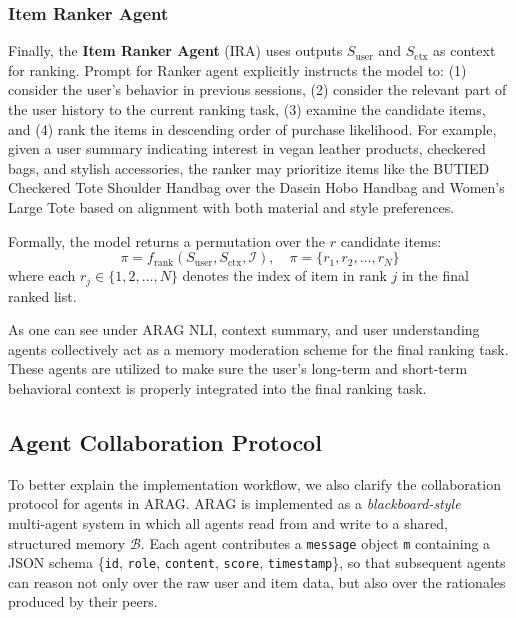 \documentclass[sigconf]{acmart}
\begin{document}
\subsubsection{Item Ranker Agent}

Finally, the \textbf{Item Ranker Agent} (IRA) uses outputs $S_{\mathrm{user}}$ and $S_{\mathrm{ctx}}$ as context for ranking. Prompt for Ranker agent explicitly instructs the model to: (1) consider the user’s behavior in previous sessions, (2) consider the relevant part of the user history to the current ranking task, (3) examine the candidate items, and (4) rank the items in descending order of purchase likelihood. For example, given a user summary indicating interest in vegan leather products, checkered bags, and stylish accessories, the ranker may prioritize items like the BUTIED Checkered Tote Shoulder Handbag over the Dasein Hobo Handbag and Women's Large Tote based on alignment with both material and style preferences.

Formally, the model returns a permutation over the $r$ candidate items:
\[
\pi = f_{\text{rank}}(S_{\mathrm{user}}, S_{\mathrm{ctx}} , \mathcal{I}), \quad \pi = \{r_1, r_2, \dots, r_N\}
\]
where each $r_j \in \{1, 2, \dots, N\}$ denotes the index of item in rank $j$ in the final ranked list. 

As one can see under ARAG NLI, context summary, and user understanding agents collectively act as a memory moderation scheme for the final ranking task. These agents are utilized to make sure the user's long-term and short-term behavioral context is properly integrated into the final ranking task. 

\subsection{Agent Collaboration Protocol}
To better explain the implementation workflow, we also clarify the collaboration protocol for agents in ARAG. ARAG is implemented as a \emph{blackboard‐style} multi‑agent system \cite{nii1986blackboard} in which all agents read from and write to a shared, structured memory $\mathcal{B}$. Each agent contributes a \texttt{message} object \texttt{m} containing a JSON schema
\{\texttt{id}, \texttt{role}, \texttt{content}, \texttt{score}, \texttt{timestamp}\}, so that subsequent agents can reason not only over the raw user and item data, but also over the rationales produced by their peers.
\end{document}
